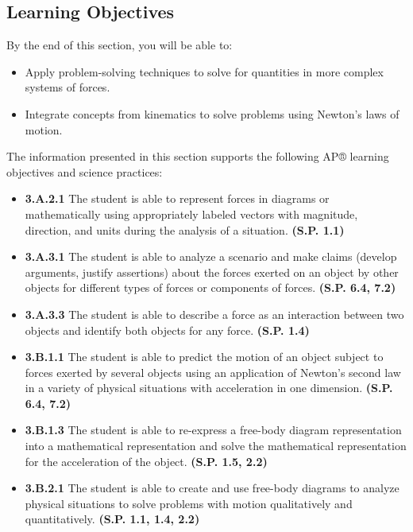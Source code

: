 \documentclass[
]{book}
\providecommand{\tightlist}{%
  \setlength{\itemsep}{0pt}\setlength{\parskip}{0pt}}
\newenvironment{learning-objectives}{}{}
\begin{document}
\hypertarget{fs-id2160702}{}
\begin{learning-objectives}

\hypertarget{learning-objectives-19}{%
\subsection{Learning Objectives}\label{learning-objectives-19}}

By the end of this section, you will be able to:

\begin{itemize}
\tightlist
\item
  Apply problem-solving techniques to solve for quantities in more
  complex systems of forces.
\item
  Integrate concepts from kinematics to solve problems using Newton's
  laws of motion.
\end{itemize}

The information presented in this section supports the following AP®
learning objectives and science practices:

\begin{itemize}
\tightlist
\item
  \textbf{3.A.2.1} The student is able to represent forces in diagrams or
  mathematically using appropriately labeled vectors with magnitude,
  direction, and units during the analysis of a situation. \textbf{(S.P.
  1.1)}
\item
  \textbf{3.A.3.1} The student is able to analyze a scenario and make
  claims (develop arguments, justify assertions) about the forces
  exerted on an object by other objects for different types of forces
  or components of forces. \textbf{(S.P. 6.4, 7.2)}
\item
  \textbf{3.A.3.3} The student is able to describe a force as an
  interaction between two objects and identify both objects for any
  force. \textbf{(S.P. 1.4)}
\item
  \textbf{3.B.1.1} The student is able to predict the motion of an object
  subject to forces exerted by several objects using an application of
  Newton's second law in a variety of physical situations with
  acceleration in one dimension. \textbf{(S.P. 6.4, 7.2)}
\item
  \textbf{3.B.1.3} The student is able to re-express a free-body diagram
  representation into a mathematical representation and solve the
  mathematical representation for the acceleration of the object.
  \textbf{(S.P. 1.5, 2.2)}
\item
  \textbf{3.B.2.1} The student is able to create and use free-body diagrams
  to analyze physical situations to solve problems with motion
  qualitatively and quantitatively. \textbf{(S.P. 1.1, 1.4, 2.2)}
\end{itemize}

\end{learning-objectives}
\end{document}
